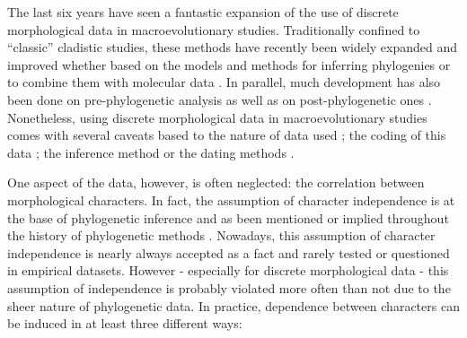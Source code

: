 \documentclass[12pt,letterpaper]{article}
\begin{document}
The last six years have seen a fantastic expansion of the use of discrete morphological data in macroevolutionary studies.
Traditionally confined to ``classic'' cladistic studies, these methods have recently been widely expanded and improved whether based on the models and methods for inferring phylogenies \citep[e.g.][]{heath2014fossilized,Wright01072016} or to combine them with molecular data \citep[e.g.][]{pyrondivergence2011,ronquista2012}.
In parallel, much development has also been done on pre-phylogenetic analysis \citep[e.g. data collection;][]{morphobank} as well as on post-phylogenetic ones \citep[e.g. morphological disparity analysis;][]{Close2015,Claddis}.
Nonetheless, using discrete morphological data in macroevolutionary studies comes with several caveats based to the nature of data used \citep{Guillerme2016146,bapst2017combined}; the coding of this data \citep{Brazeau2011,simoes2017giant}; the inference method \citep{spencerefficacy2013,wrightbayesian2014,OReilly20160081,puttick2017uncertain,goloboff2017weighted} or the dating methods \citep{Arcila2015131,o2016tips}.

One aspect of the data, however, is often neglected: the correlation between morphological characters.
In fact, the assumption of character independence is at the base of phylogenetic inference and as been mentioned or implied throughout the history of phylogenetic methods \citep[e.g.][]{joysey1982problems,felsenstein1985phylogenies,lewisa2001,felsenstein2004inferring}.
Nowadays, this assumption of character independence is nearly always accepted as a fact and rarely tested or questioned in empirical datasets.
However - especially for discrete morphological data - this assumption of independence is probably violated more often than not due to the sheer nature of phylogenetic data.
In practice, dependence between characters can be induced in at least three different ways:
\end{document}

